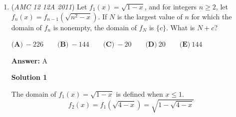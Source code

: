 \begin{enumerate}
$f(100)=2(100-1)(100-2.5)=19305 \implies k=3 \implies \boxed{\textbf{(C)}\ 3}$




\textbf{Solution 3 (Essentially the same thing as Solution 1)}

So we know that $a,b,c$ are integers so we can use this to our advantage 

 $\quad$

 Using $f(1)=0$, we get the equation $a+b+c=0$ and $f(7)=49a+7b+c=5X$ where $X$ is a decimal digit placeholder. (Ex. $X=2$ provides the value $52$) 

 $\quad$

 Solving for $b$ using the system of equations, we get $48a+6b=5X$ $\implies$ $b=-8a+ \frac{5X}{6}$
$\quad$

 Since we know that $a$ and $b$ are both integers, we know that $\frac{5X}{6}$ $\in$ $\mathbb{Z}$ $\implies$ $X=4$ and by extension $b=-8a+9$
$\quad$

 Attempting to solve for $b$ again using the system $f(8)=64a+8b+c=7Y$ ($Y$ is another decimal digit placeholder),$f(1)=a+b+c=0$ gives us $b=-9a+ \frac{7Y}{7}$ $\implies$ $Y=7$ $\implies$ $b=-9a+11$
$\quad$

 This leads to $-8a+9=-9a+11$ $\implies$ $a=2$ $\implies$ $b=-7$
$\quad$

 Plugging in the values of $a$ and $b$ into $f(1)=a+b+c=0$, we get $c=5$
$\quad$

 Substituting the values of $a,b,c$ into $f(100)=10000a+100b+c$, we get $f(100)=19305$ and $5000k<19305<5000(k+1)$ $\implies$ $k=3$ $\implies$ $\boxed{\textbf{(C)}\ 3}$
$\quad$
$\textbf{Note}$: We can say that $f(7)=5X$ and $f(8)=7Y$ because we are given that $50<f(7)<60$ and $70<f(8)<80$



	\item (\textit{AMC 12 12A 2011}) Let $f_{1}(x)=\sqrt{1-x}$, and for integers $n \geq 2$, let $f_{n}(x)=f_{n-1}(\sqrt{n^2 - x})$. If $N$ is the largest value of $n$ for which the domain of $f_{n}$ is nonempty, the domain of $f_{N}$ is $\{ c\}$. What is $N+c$?


 $\textbf{(A)}\ -226 \qquad \textbf{(B)}\ -144 \qquad \textbf{(C)}\ -20 \qquad \textbf{(D)}\ 20 \qquad \textbf{(E)}\ 144$

 \textbf{Answer: }A



\textbf{Solution 1}

The domain of $f_{1}(x)=\sqrt{1-x}$ is defined when $x\leq1$. 
 \[f_{2}(x)=f_{1}\left(\sqrt{4-x}\right)=\sqrt{1-\sqrt{4-x}}\] 


\end{enumerate}
